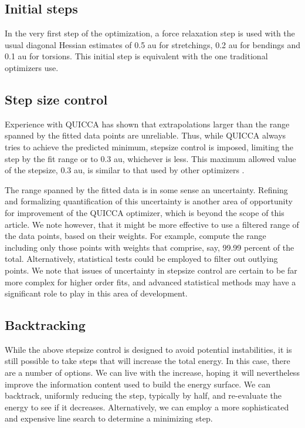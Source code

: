 \documentclass[prl,aps,preprint,superbib,12pt]{revtex4}
\begin{document}
\subsection{Initial steps}

In the very first step of the optimization, a force relaxation step is used with the usual 
diagonal Hessian estimates of 0.5 au for stretchings, 0.2 au for bendings and 0.1 au for 
torsions.  This initial step is equivalent with the one traditional optimizers use.

\subsection{Step size control} \label{stepsizectrl}

Experience with QUICCA has shown that extrapolations larger 
than the range spanned by the fitted data points are unreliable.   Thus, 
while QUICCA  always tries to achieve the predicted minimum, 
stepsize control is imposed, limiting the step  by  the fit range or to 
0.3 au, whichever is less.   This maximum allowed value of the stepsize, 0.3 au, 
is similar to that used by other optimizers \cite{FEckert97}.  

The range spanned by the fitted data is in some sense an uncertainty.  
Refining and formalizing quantification of this uncertainty is another area of 
opportunity for improvement of the QUICCA optimizer, which is beyond the 
scope of this article.  We note however, that it might be more effective
to use a filtered range of the data points, based on their weights. 
For example, compute the range including only those points with weights that 
comprise, say,  99.99 percent of the total.   Alternatively, statistical 
tests could be employed to filter out outlying points.  We note that issues of
uncertainty in stepsize control are certain to be far more complex for higher 
order fits, and advanced statistical methods may have a significant role 
to play in this area of development.

\subsection{Backtracking}

While the above stepsize control is designed to avoid potential instabilities,
it is still possible to take steps that will increase the total energy.  In 
this case, there are a number of options.  We can live with the increase, 
hoping it will nevertheless improve the information content used to build the energy 
surface.  We can backtrack, uniformly reducing the step, typically by half, and re-evaluate
the energy to see if it decreases.   Alternatively, we can employ a more 
sophisticated and expensive line search to determine a minimizing step.  
\end{document}
